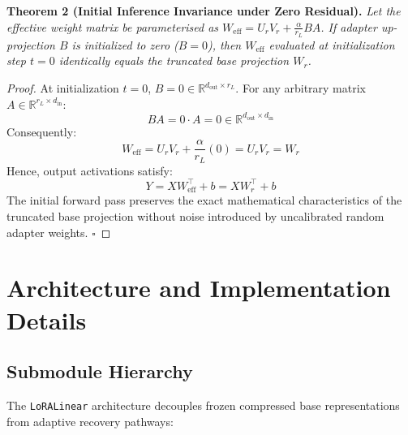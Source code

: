 {\textbf{Theorem 2 (Initial Inference Invariance under Zero Residual).} \textit{Let the effective weight matrix be parameterised as $W_{\text{eff}} = U_r V_r + \frac{\alpha}{r_L} B A$. If adapter up-projection $B$ is initialized to zero ($B = 0$), then $W_{\text{eff}}$ evaluated at initialization step $t=0$ identically equals the truncated base projection $W_r$.}

\begin{proof}
At initialization $t=0$, $B = 0 \in \mathbb{R}^{d_{\text{out}} \times r_L}$. For any arbitrary matrix $A \in \mathbb{R}^{r_L \times d_{\text{in}}}$:
\[
B A = 0 \cdot A = 0 \in \mathbb{R}^{d_{\text{out}} \times d_{\text{in}}}
\]
Consequently:
\[
W_{\text{eff}} = U_r V_r + \frac{\alpha}{r_L} (0) = U_r V_r = W_r
\]
Hence, output activations satisfy:
\[
Y = X W_{\text{eff}}^\top + b = X W_r^\top + b
\]
The initial forward pass preserves the exact mathematical characteristics of the truncated base projection without noise introduced by uncalibrated random adapter weights. $\square$
\end{proof}


\section{Architecture and Implementation Details}

\subsection{Submodule Hierarchy}
The \texttt{LoRALinear} architecture decouples frozen compressed base representations from adaptive recovery pathways:

}
